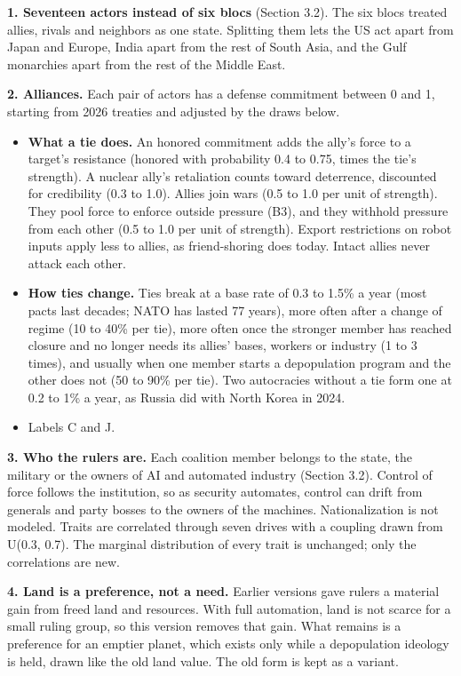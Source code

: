 \documentclass[
  10pt,
]{article}
\providecommand{\tightlist}{%
  \setlength{\itemsep}{0pt}\setlength{\parskip}{0pt}}
\begin{document}
\textbf{1. Seventeen actors instead of six blocs} (Section 3.2). The six blocs treated allies,
rivals and neighbors as one state. Splitting them lets the US act apart from Japan and Europe, India
apart from the rest of South Asia, and the Gulf monarchies apart from the rest of the Middle East.

\textbf{2. Alliances.} Each pair of actors has a defense commitment between 0 and 1, starting from
2026 treaties and adjusted by the draws below.

\begin{itemize}
\tightlist
\item
  \textbf{What a tie does.} An honored commitment adds the ally's force to a target's resistance
  (honored with probability 0.4 to 0.75, times the tie's strength). A nuclear ally's retaliation
  counts toward deterrence, discounted for credibility (0.3 to 1.0). Allies join wars (0.5 to 1.0
  per unit of strength). They pool force to enforce outside pressure (B3), and they withhold
  pressure from each other (0.5 to 1.0 per unit of strength). Export restrictions on robot inputs
  apply less to allies, as friend-shoring does today. Intact allies never attack each other.
\item
  \textbf{How ties change.} Ties break at a base rate of 0.3 to 1.5\% a year (most pacts last
  decades; NATO has lasted 77 years), more often after a change of regime (10 to 40\% per tie), more
  often once the stronger member has reached closure and no longer needs its allies' bases, workers
  or industry (1 to 3 times), and usually when one member starts a depopulation program and the
  other does not (50 to 90\% per tie). Two autocracies without a tie form one at 0.2 to 1\% a year,
  as Russia did with North Korea in 2024.
\item
  Labels C and J.
\end{itemize}

\textbf{3. Who the rulers are.} Each coalition member belongs to the state, the military or the
owners of AI and automated industry (Section 3.2). Control of force follows the institution, so as
security automates, control can drift from generals and party bosses to the owners of the machines.
Nationalization is not modeled. Traits are correlated through seven drives with a coupling drawn
from U(0.3, 0.7). The marginal distribution of every trait is unchanged; only the correlations are
new.

\textbf{4. Land is a preference, not a need.} Earlier versions gave rulers a material gain from
freed land and resources. With full automation, land is not scarce for a small ruling group, so this
version removes that gain. What remains is a preference for an emptier planet, which exists only
while a depopulation ideology is held, drawn like the old land value. The old form is kept as a
variant.
\end{document}
